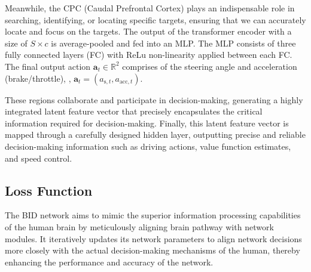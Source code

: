 Meanwhile, the CPC (Caudal Prefrontal Cortex) plays an indispensable role in searching, identifying, or locating specific targets, ensuring that we can accurately locate and focus on the targets. 
The output of the transformer encoder with a size of $S\times c$ is average-pooled and fed into an MLP. 
The MLP consists of three fully connected layers (FC) with ReLu non-linearity applied between each FC. 
The final output action $\mathbf{a}_t\in\mathbb{R}^2$ comprises of the steering angle and acceleration (brake/throttle), {\ie}, $\mathbf{a}_{t} = (a_{\text{s},t}, a_{\text{acc}, t})$. 


These regions collaborate and participate in decision-making, generating a highly integrated latent feature vector that precisely encapsulates the critical information required for decision-making. 
Finally, this latent feature vector is mapped through a carefully designed hidden layer, outputting precise and reliable decision-making information such as driving actions, value function estimates, and speed control.


\subsection{Loss Function}

\hspace{1pc}The BID network aims to mimic the superior information processing capabilities of the human brain by meticulously aligning brain pathway  with network modules. 
It iteratively updates its network parameters to align network decisions more closely with the actual decision-making mechanisms of the human, thereby enhancing the performance and accuracy of the network. 


